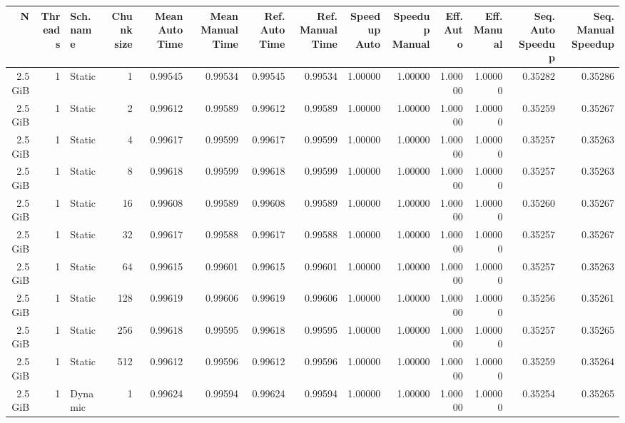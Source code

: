         \begin{table}[H]
            \centering
            \begin{adjustbox}{width=\textwidth, keepaspectratio}
                \begin{tabular}{rrlrrrrrrrrrrr}
                    \toprule
                    N & Threads & Sch. name & Chunk size & Mean Auto Time & Mean Manual Time & Ref. Auto Time & Ref. Manual Time & Speedup Auto & Speedup Manual & Eff. Auto & Eff. Manual & Seq. Auto Speedup & Seq. Manual Speedup \\
                    \midrule
                    2.5 GiB & 1 & Static & 1 & 0.99545 & 0.99534 & 0.99545 & 0.99534 & 1.00000 & 1.00000 & 1.00000 & 1.00000 & 0.35282 & 0.35286 \\
                    2.5 GiB & 1 & Static & 2 & 0.99612 & 0.99589 & 0.99612 & 0.99589 & 1.00000 & 1.00000 & 1.00000 & 1.00000 & 0.35259 & 0.35267 \\
                    2.5 GiB & 1 & Static & 4 & 0.99617 & 0.99599 & 0.99617 & 0.99599 & 1.00000 & 1.00000 & 1.00000 & 1.00000 & 0.35257 & 0.35263 \\
                    2.5 GiB & 1 & Static & 8 & 0.99618 & 0.99599 & 0.99618 & 0.99599 & 1.00000 & 1.00000 & 1.00000 & 1.00000 & 0.35257 & 0.35263 \\
                    2.5 GiB & 1 & Static & 16 & 0.99608 & 0.99589 & 0.99608 & 0.99589 & 1.00000 & 1.00000 & 1.00000 & 1.00000 & 0.35260 & 0.35267 \\
                    2.5 GiB & 1 & Static & 32 & 0.99617 & 0.99588 & 0.99617 & 0.99588 & 1.00000 & 1.00000 & 1.00000 & 1.00000 & 0.35257 & 0.35267 \\
                    2.5 GiB & 1 & Static & 64 & 0.99615 & 0.99601 & 0.99615 & 0.99601 & 1.00000 & 1.00000 & 1.00000 & 1.00000 & 0.35257 & 0.35263 \\
                    2.5 GiB & 1 & Static & 128 & 0.99619 & 0.99606 & 0.99619 & 0.99606 & 1.00000 & 1.00000 & 1.00000 & 1.00000 & 0.35256 & 0.35261 \\
                    2.5 GiB & 1 & Static & 256 & 0.99618 & 0.99595 & 0.99618 & 0.99595 & 1.00000 & 1.00000 & 1.00000 & 1.00000 & 0.35257 & 0.35265 \\
                    2.5 GiB & 1 & Static & 512 & 0.99612 & 0.99596 & 0.99612 & 0.99596 & 1.00000 & 1.00000 & 1.00000 & 1.00000 & 0.35259 & 0.35264 \\
                    2.5 GiB & 1 & Dynamic & 1 & 0.99624 & 0.99594 & 0.99624 & 0.99594 & 1.00000 & 1.00000 & 1.00000 & 1.00000 & 0.35254 & 0.35265 \\

\end{tabular}
\end{adjustbox}
\end{table}
